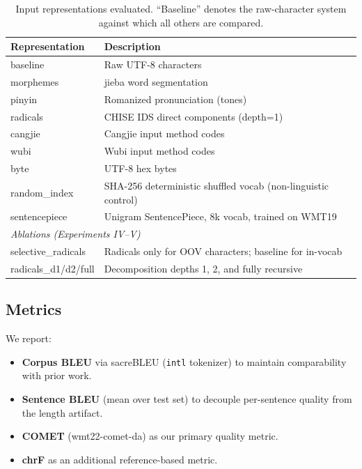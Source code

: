 \documentclass[11pt]{article}
\begin{document}
\begin{table}[t]
\centering
\small
\begin{tabular}{lp{4.8cm}}
\toprule
\textbf{Representation} & \textbf{Description} \\
\midrule
baseline         & Raw UTF-8 characters \\
morphemes        & jieba word segmentation \\
pinyin           & Romanized pronunciation (tones) \\
radicals         & CHISE IDS direct components (depth=1) \\
cangjie          & Cangjie input method codes \\
wubi             & Wubi input method codes \\
\midrule
byte             & UTF-8 hex bytes \\
random\_index    & SHA-256 deterministic shuffled vocab (non-linguistic control) \\
sentencepiece    & Unigram SentencePiece, 8k vocab, trained on WMT19 \\
\midrule
\multicolumn{2}{l}{\textit{Ablations (Experiments IV--V)}} \\
selective\_radicals & Radicals only for OOV characters; baseline for in-vocab \\
radicals\_d1/d2/full & Decomposition depths 1, 2, and fully recursive \\
\bottomrule
\end{tabular}
\caption{Input representations evaluated. ``Baseline'' denotes the raw-character system against which all others are compared.}
\label{tab:reps}
\end{table}

\subsection{Metrics}

We report:
\begin{itemize}
\item \textbf{Corpus BLEU} \citep{papineni-etal-2002-bleu} via sacreBLEU \citep{post-2018-call} (\texttt{intl} tokenizer) to maintain comparability with prior work.
\item \textbf{Sentence BLEU} (mean over test set) to decouple per-sentence quality from the length artifact.
\item \textbf{COMET} \citep{rei-etal-2022-comet} (wmt22-comet-da) as our primary quality metric.
\item \textbf{chrF} \citep{popovic-2015-chrf} as an additional reference-based metric.
\end{itemize}
\end{document}
